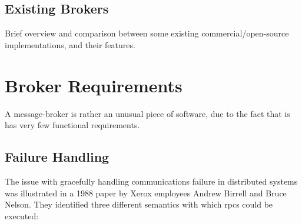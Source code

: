 \subsection{Existing Brokers}
\label{sub:Existing Brokers}

Brief overview and comparison between some existing commercial/open-source
implementations, and their features.


\section{Broker Requirements}
\label{sec:requirements}

A message-broker is rather an unusual piece of software, due to the fact that is
has very few functional requirements.

\subsection{Failure Handling}
\label{sub:Failure Handling}

The issue with gracefully handling communications failure in distributed systems
was illustrated in a 1988 paper by Xerox employees Andrew Birrell and Bruce
Nelson\cite{Birrell:1988:IRP:59309.59336}. They identified three different
semantics with which \glspl{rpc} could be executed:

